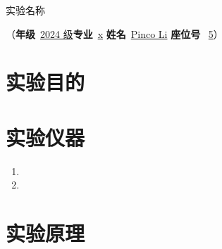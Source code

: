 ﻿\documentclass[12pt,a4paper]{article}
\begin{document}
\begin{center}
  {\heiti 实验名称}
\end{center}
\vspace{0.5\baselineskip}
\begin{center}
  （\textbf{年级}\ \underline{2024 级}\quad \textbf{专业}\ \underline{x} \quad \textbf{姓名}\ \underline{Pinco Li} \quad \textbf{座位号} \ \underline{5}）
\end{center}
\vspace{0.5\baselineskip}

\section{实验目的}


\section{实验仪器}

\begin{enumerate}
    \item 
    \item 
\end{enumerate}


\section{实验原理}


\end{document}
